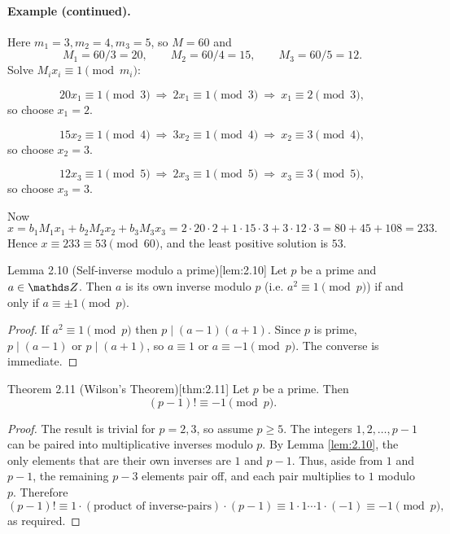 \documentclass[10pt]{article}
\theoremstyle{definition}
\theoremstyle{plain}
\numberwithin{equation}{section}
\begin{document}
\paragraph{Example (continued).}
Here $m_1=3,m_2=4,m_3=5$, so $M=60$ and
\[
M_1=60/3=20,\qquad M_2=60/4=15,\qquad M_3=60/5=12.
\]
Solve $M_i x_i\equiv 1\pmod{m_i}$:

\[
20x_1\equiv 1\pmod{3}\ \Longrightarrow\ 2x_1\equiv 1\pmod{3}\ \Longrightarrow\ x_1\equiv 2\pmod{3},
\]
so choose $x_1=2$.

\[
15x_2\equiv 1\pmod{4}\ \Longrightarrow\ 3x_2\equiv 1\pmod{4}\ \Longrightarrow\ x_2\equiv 3\pmod{4},
\]
so choose $x_2=3$.

\[
12x_3\equiv 1\pmod{5}\ \Longrightarrow\ 2x_3\equiv 1\pmod{5}\ \Longrightarrow\ x_3\equiv 3\pmod{5},
\]
so choose $x_3=3$.

Now
\[
x = b_1M_1x_1 + b_2M_2x_2 + b_3M_3x_3
= 2\cdot 20\cdot 2 + 1\cdot 15\cdot 3 + 3\cdot 12\cdot 3 = 80 + 45 + 108 = 233.
\]
Hence $x\equiv 233\equiv 53\pmod{60}$, and the least positive solution is $53$.


\begin{define}{Lemma 2.10 (Self-inverse modulo a prime)}[lem:2.10]
Let $p$ be a prime and $a\in\setZ$. Then $a$ is its own inverse modulo $p$
(i.e. $a^2\equiv 1\pmod{p}$) if and only if $a\equiv \pm 1\pmod{p}$.
\end{define}

\begin{proof}
If $a^2\equiv 1\pmod{p}$ then $p\mid(a-1)(a+1)$. Since $p$ is prime, $p\mid(a-1)$ or $p\mid(a+1)$,
so $a\equiv 1$ or $a\equiv -1\pmod{p}$. The converse is immediate.
\end{proof}

\begin{define}{Theorem 2.11 (Wilson's Theorem)}[thm:2.11]
Let $p$ be a prime. Then
\[
(p-1)!\equiv -1\pmod{p}.
\]
\end{define}

\begin{proof}
The result is trivial for $p=2,3$, so assume $p\ge 5$. The integers $1,2,\dots,p-1$ can be
paired into multiplicative inverses modulo $p$. By Lemma \ref{lem:2.10}, the only elements
that are their own inverses are $1$ and $p-1$. Thus, aside from $1$ and $p-1$, the remaining
$p-3$ elements pair off, and each pair multiplies to $1$ modulo $p$. Therefore
\[
(p-1)! \equiv 1\cdot ( \text{product of inverse-pairs} ) \cdot (p-1) \equiv 1\cdot 1\cdots 1 \cdot (-1)
\equiv -1\pmod{p},
\]
as required.
\end{proof}
\end{document}
